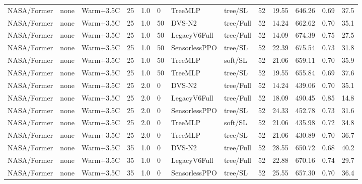 \documentclass[10pt,a4paper]{article}
\begin{document}
\begin{landscape}
\begin{longtable}{llllllllrrrrr}
NASA/Former & none & Warm+3.5C & 25 & 1.0 & 0 & TreeMLP & tree/SL & 52 & 19.55 & 646.26 & 0.69 & 37.5 \\

NASA/Former & none & Warm+3.5C & 25 & 1.0 & 50 & DVS-N2 & tree/Full & 52 & 14.24 & 662.62 & 0.70 & 35.1 \\

NASA/Former & none & Warm+3.5C & 25 & 1.0 & 50 & LegacyV6Full & tree/Full & 52 & 14.09 & 674.39 & 0.75 & 27.5 \\

NASA/Former & none & Warm+3.5C & 25 & 1.0 & 50 & SensorlessPPO & tree/SL & 52 & 22.39 & 675.54 & 0.73 & 31.8 \\

NASA/Former & none & Warm+3.5C & 25 & 1.0 & 50 & TreeMLP & soft/SL & 52 & 21.06 & 659.11 & 0.70 & 35.9 \\

NASA/Former & none & Warm+3.5C & 25 & 1.0 & 50 & TreeMLP & tree/SL & 52 & 19.55 & 655.84 & 0.69 & 37.6 \\

NASA/Former & none & Warm+3.5C & 25 & 2.0 & 0 & DVS-N2 & tree/Full & 52 & 14.24 & 439.06 & 0.70 & 35.1 \\

NASA/Former & none & Warm+3.5C & 25 & 2.0 & 0 & LegacyV6Full & tree/Full & 52 & 18.09 & 490.45 & 0.85 & 14.8 \\

NASA/Former & none & Warm+3.5C & 25 & 2.0 & 0 & SensorlessPPO & tree/SL & 52 & 24.33 & 452.78 & 0.73 & 31.6 \\

NASA/Former & none & Warm+3.5C & 25 & 2.0 & 0 & TreeMLP & soft/SL & 52 & 21.06 & 435.98 & 0.72 & 34.8 \\

NASA/Former & none & Warm+3.5C & 25 & 2.0 & 0 & TreeMLP & tree/SL & 52 & 21.06 & 430.89 & 0.70 & 36.7 \\

NASA/Former & none & Warm+3.5C & 35 & 1.0 & 0 & DVS-N2 & tree/Full & 52 & 28.55 & 650.72 & 0.68 & 40.2 \\

NASA/Former & none & Warm+3.5C & 35 & 1.0 & 0 & LegacyV6Full & tree/Full & 52 & 22.88 & 670.16 & 0.74 & 29.7 \\

NASA/Former & none & Warm+3.5C & 35 & 1.0 & 0 & SensorlessPPO & tree/SL & 52 & 25.55 & 657.30 & 0.70 & 36.4 \\


\end{longtable}
\end{landscape}
\end{document}
